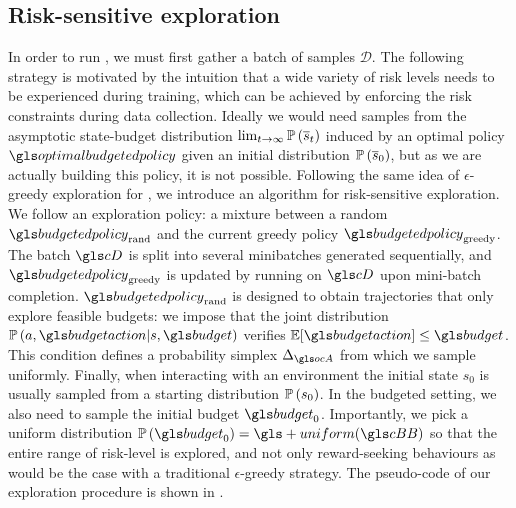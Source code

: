 \subsection{Risk-sensitive exploration}
\label{sec:exploration}

In order to run , we must first gather a batch of samples $\mathcal{D}$. The following strategy is motivated by the intuition that a wide variety of risk levels needs to be experienced during training, which can be achieved by enforcing the risk constraints during data collection. Ideally we would need samples from the asymptotic state-budget distribution $\lim_{t\rightarrow\infty}\mathbb{P}\left(\overline{s}_t\right)$ induced by an optimal policy $\optimalbudgetedpolicy$ given an initial distribution $\mathbb{P}\left(\overline{s}_0\right)$, but as we are actually building this policy, it is not possible. Following the same idea of $\epsilon$-greedy exploration for \FTQ, we introduce an algorithm for risk-sensitive exploration. We follow an exploration policy: a mixture between a random  $\budgetedpolicy_\text{rand}$ and the current greedy policy $\budgetedpolicy_\text{greedy}$. The batch $\cD$ is split into several minibatches generated sequentially, and $\budgetedpolicy_\text{greedy}$ is updated by running  on $\cD$ upon mini-batch completion. $\budgetedpolicy_\text{rand}$ is designed to obtain trajectories that only explore feasible budgets: we impose that the joint distribution $\probability{a, \budgetaction|s, \budget}$ verifies $\expectedvalue[\budgetaction]\leq\budget$. This condition defines a probability simplex $\Delta_{\ocA}$ from which we sample uniformly. Finally, when interacting with an environment the initial state $s_0$ is usually sampled from a starting distribution $\mathbb{P}\left(s_0\right)$. In the budgeted setting, we also need to sample the initial budget $\budget_0$. Importantly, we pick a uniform distribution $\probability{\budget_0} = \gls+{uniform}(\budgetspace)$ so that the entire range of risk-level is explored, and not only reward-seeking behaviours as would be the case with a traditional  $\epsilon$-greedy strategy. The pseudo-code of our exploration procedure is shown in .%



